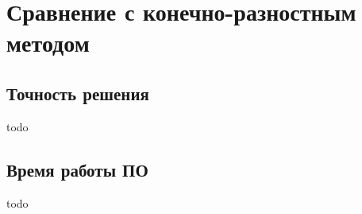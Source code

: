\section{Сравнение с конечно-разностным методом}

\subsection{Точность решения}
todo

\subsection{Время работы ПО}
todo

\clearpage